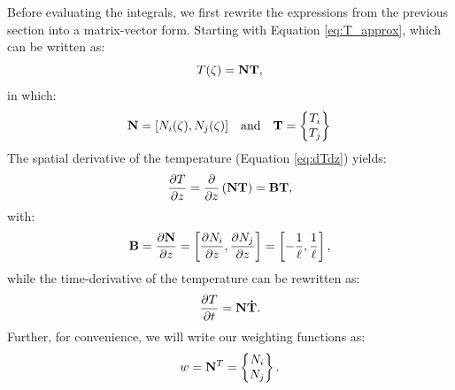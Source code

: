 \documentclass[10pt, a4paper, twoside, headinclude,footinclude, BCOR5mm]{scrartcl}
\begin{document}
\begin{tcolorbox}[colback=gray!5,colframe=gray!40!black,title=Matrix-vector notation]
Before evaluating the integrals, we first rewrite the expressions from the previous section into a matrix-vector form. Starting with Equation \ref{eq:T_approx}, which can be written as:
\begin{equation*}
  T(\zeta) = \bold{N}\bold{T},
\end{equation*}
in which:
\begin{equation*}
\bold{N} = [N_i(\zeta), N_j(\zeta)] \quad\text{and}\quad
\bold{T} = \begin{Bmatrix} T_i \\ T_j \end{Bmatrix} \,
\end{equation*}
The spatial derivative of the temperature (Equation \ref{eq:dTdz}) yields:
\begin{equation*}
  \frac{\partial T}{\partial z} =
  \frac{\partial}{\partial z}\left(\bold{N}\bold{T}\right) =
  \bold{B}\bold{T},
\end{equation*}
with:
\begin{equation*}
  \bold{B} = \frac{\partial \bold{N}}{\partial z} =
  \left[\frac{\partial N_i}{\partial z}, \frac{\partial N_j}{\partial z}\right] =
  \left[-\frac{1}{\ell}, \frac{1}{\ell}\right],
\end{equation*}
while the time-derivative of the temperature can be rewritten as:
\begin{equation*}
  \frac{\partial T}{\partial t} =
  \bold{N}\bold{\dot{T}}.
\end{equation*}
Further, for convenience, we will write our weighting functions as:
\begin{equation*}
  w = \bold{N}^T = \begin{Bmatrix} N_i \\ N_j \end{Bmatrix}.
\end{equation*}
\end{tcolorbox}
\end{document}
